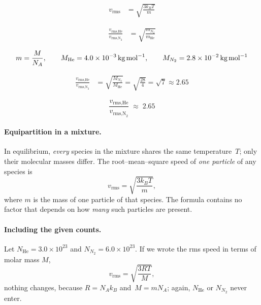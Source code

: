 \documentclass[12pt]{article}
\theoremstyle{definition} %
\theoremstyle{plain} %
\begin{document}

\begin{align}
  v_{\text{rms}}
    &= \sqrt{\frac{3 k_B T}{m}}
  \end{align}
  
  \begin{align}
  \frac{v_{\text{rms,He}}}{v_{\text{rms,N}_2}}
    &= \sqrt{\frac{m_{N_2}}{m_{\text{He}}}}
  \end{align}
  
  \begin{align}
  m = \frac{M}{N_A}, \qquad
  M_{\text{He}} = 4.0\times10^{-3}\,\text{kg\,mol}^{-1}, \qquad
  M_{N_2} = 2.8\times10^{-2}\,\text{kg\,mol}^{-1}
  \end{align}
  
  \begin{align}
  \frac{v_{\text{rms,He}}}{v_{\text{rms,N}_2}}
    &= \sqrt{\frac{M_{N_2}}{M_{\text{He}}}}
     = \sqrt{\frac{28}{4}}
     = \sqrt{7}
     \approx 2.65
  \end{align}
  
  \[
  \boxed{\displaystyle
    \frac{v_{\text{rms,He}}}{v_{\text{rms,N}_2}} \;\approx\; 2.65
  }
  \]

\paragraph{Equipartition in a mixture.}
In equilibrium, \emph{every} species in the mixture shares the same
temperature~\(T\);
only their molecular masses differ.
The root–mean–square speed of \emph{one particle} of any species is
\[
v_{\text{rms}}
   = \sqrt{\frac{3k_B T}{m}},
\]
where \(m\) is the mass of one particle of that species.
The formula contains no factor that depends on how \emph{many}
such particles are present.

\paragraph{Including the given counts.}
Let \(N_{\text{He}}=3.0\times10^{23}\) and
\(N_{N_2}=6.0\times10^{23}\).
If we wrote the rms speed in terms of molar mass \(M\),
\[
v_{\text{rms}}
   = \sqrt{\frac{3 R T}{M}},
\]
nothing changes, because \(R=N_A k_B\) and
\(\,M=m N_A\); again, \(N_{\text{He}}\) or \(N_{N_2}\) never enter.
\end{document}

